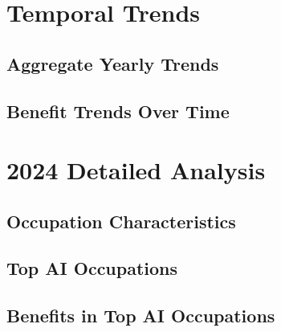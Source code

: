 \documentclass{article}
\begin{document}
\section{Temporal Trends}
\subsection{Aggregate Yearly Trends}


\subsection{Benefit Trends Over Time}


\section{2024 Detailed Analysis}
\subsection{Occupation Characteristics}


\subsection{Top AI Occupations}


\subsection{Benefits in Top AI Occupations}

\end{document}
